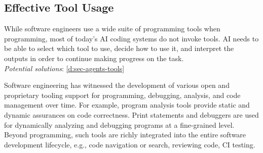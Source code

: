 











\subsection{Effective Tool Usage} \label{sec:c-tool-use}

\begin{tcolorbox}[colback=lightgreen, boxrule=0pt, arc=5pt, outer arc=5pt, after skip=10pt plus 2pt]
While software engineers use a wide suite of programming tools when programming, most of today's AI coding systems do not invoke tools. AI needs to be able to select which tool to use, decide how to use it, and interpret the outputs in order to continue making progress on the task.
\newline \\
\textit{Potential solutions}: \ref{d:sec-agents-tools}
\end{tcolorbox}

Software engineering has witnessed the development of various open and proprietary tooling support for programming, debugging, analysis, and code management over time.
For example, program analysis tools provide static and dynamic assurances on code correctness. 
Print statements and debuggers are used for dynamically analyzing and debugging programs at a fine-grained level.
Beyond programming, such tools are richly integrated into the entire software development lifecycle, e.g., code navigation or search, reviewing code, CI testing.

